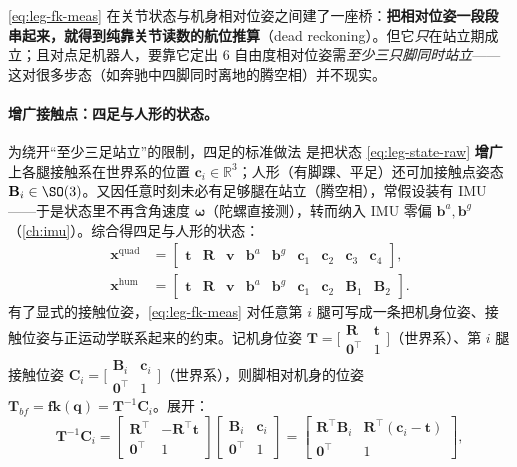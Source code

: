 \cref{eq:leg-fk-meas} 在关节状态与机身相对位姿之间建了一座桥：\textbf{把相对位姿一段段串起来，就得到纯靠关节读数的航位推算}（dead reckoning）。但它\emph{只}在站立期成立；且对点足机器人，要靠它定出 $6$ 自由度相对位姿需\emph{至少三只脚同时站立}——这对很多步态（如奔驰中四脚同时离地的腾空相）并不现实。

\paragraph{增广接触点：四足与人形的状态。}
为绕开“至少三足站立”的限制，四足的标准做法\cite{bloesch2013state} 是把状态 \cref{eq:leg-state-raw} \textbf{增广}上各腿接触系在世界系的位置 $\mathbf{c}_i\in\mathbb{R}^3$；人形（有脚踝、平足）还可加接触点姿态 $\mathbf{B}_i\in\SO(3)$。又因任意时刻未必有足够腿在站立（腾空相），常假设装有 IMU——于是状态里不再含角速度 $\boldsymbol{\omega}$（陀螺直接测），转而纳入 IMU 零偏 $\mathbf{b}^a,\mathbf{b}^g$（\cref{ch:imu}）。综合得四足与人形的状态：
\begin{align}
  \mathbf{x}^{\text{quad}}&=\begin{bmatrix}\mathbf{t} & \mathbf{R} & \mathbf{v} & \mathbf{b}^a & \mathbf{b}^g & \mathbf{c}_1 & \mathbf{c}_2 & \mathbf{c}_3 & \mathbf{c}_4\end{bmatrix},\label{eq:leg-state-quad}\\
  \mathbf{x}^{\text{hum}}&=\begin{bmatrix}\mathbf{t} & \mathbf{R} & \mathbf{v} & \mathbf{b}^a & \mathbf{b}^g & \mathbf{c}_1 & \mathbf{c}_2 & \mathbf{B}_1 & \mathbf{B}_2\end{bmatrix}.\label{eq:leg-state-hum}
\end{align}
有了显式的接触位姿，\cref{eq:leg-fk-meas} 对任意第 $i$ 腿可写成一条把机身位姿、接触位姿与正运动学联系起来的约束。记机身位姿 $\mathbf{T}=\big[\begin{smallmatrix}\mathbf{R}&\mathbf{t}\\\mathbf{0}^\top&1\end{smallmatrix}\big]$（世界系）、第 $i$ 腿接触位姿 $\mathbf{C}_i=\big[\begin{smallmatrix}\mathbf{B}_i&\mathbf{c}_i\\\mathbf{0}^\top&1\end{smallmatrix}\big]$（世界系），则脚相对机身的位姿 $\mathbf{T}_{bf}=\mathbf{fk}(\mathbf{q})=\mathbf{T}^{-1}\mathbf{C}_i$。展开：
\begin{equation}
  \mathbf{T}^{-1}\mathbf{C}_i=\begin{bmatrix}\mathbf{R}^\top & -\mathbf{R}^\top\mathbf{t}\\\mathbf{0}^\top & 1\end{bmatrix}\begin{bmatrix}\mathbf{B}_i & \mathbf{c}_i\\\mathbf{0}^\top & 1\end{bmatrix}=\begin{bmatrix}\mathbf{R}^\top\mathbf{B}_i & \mathbf{R}^\top(\mathbf{c}_i-\mathbf{t})\\\mathbf{0}^\top & 1\end{bmatrix},
  \label{eq:leg-Tc-expand}
\end{equation}
